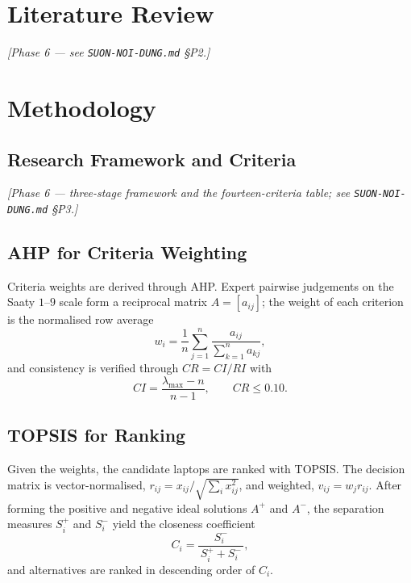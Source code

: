 \documentclass[11pt,a4paper]{article}
\begin{document}
\section{Literature Review}\label{sec:p-lit}
\textit{[Phase 6 — see \texttt{SUON-NOI-DUNG.md} \S P2.]}

\section{Methodology}\label{sec:p-method}

\subsection{Research Framework and Criteria}\label{sec:p-framework}
\textit{[Phase 6 — three-stage framework and the fourteen-criteria table; see \texttt{SUON-NOI-DUNG.md} \S P3.]}

\subsection{AHP for Criteria Weighting}\label{sec:p-ahp}
Criteria weights are derived through AHP. Expert pairwise judgements on the Saaty $1$--$9$ scale
form a reciprocal matrix $A=[a_{ij}]$; the weight of each criterion is the normalised row average
\begin{equation}\label{eq:p-weight}
  w_i = \frac{1}{n}\sum_{j=1}^{n}\frac{a_{ij}}{\sum_{k=1}^{n}a_{kj}},
\end{equation}
and consistency is verified through $CR = CI/RI$ with
\begin{equation}\label{eq:p-cr}
  CI = \frac{\lambda_{\max}-n}{\,n-1\,}, \qquad CR \le 0.10.
\end{equation}

\subsection{TOPSIS for Ranking}\label{sec:p-topsis}
Given the weights, the candidate laptops are ranked with TOPSIS. The decision matrix is
vector-normalised, $r_{ij}=x_{ij}/\sqrt{\sum_i x_{ij}^2}$, and weighted, $v_{ij}=w_j r_{ij}$.
After forming the positive and negative ideal solutions $A^{+}$ and $A^{-}$, the separation
measures $S_i^{+}$ and $S_i^{-}$ yield the closeness coefficient
\begin{equation}\label{eq:p-closeness}
  C_i = \frac{S_i^{-}}{\,S_i^{+}+S_i^{-}\,},
\end{equation}
and alternatives are ranked in descending order of $C_i$.
\end{document}
